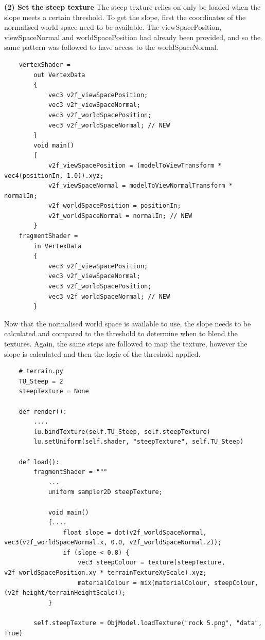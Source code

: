\documentclass[a4 paper, 12pt]{article}
\begin{document}
\textbf{(2) Set the steep texture}
The steep texture relies on only be loaded when the slope meets a certain threshold. To get the slope, first the coordinates of the normalised world space need to be available. The viewSpacePosition, viewSpaceNormal and worldSpacePosition had already been provided, and so the same pattern was followed to have access to the worldSpaceNormal.
    \begin{lstlisting}
    vertexShader =
        out VertexData
        {
            vec3 v2f_viewSpacePosition;
            vec3 v2f_viewSpaceNormal;
            vec3 v2f_worldSpacePosition;
            vec3 v2f_worldSpaceNormal; // NEW
        }
        void main()
        {
            v2f_viewSpacePosition = (modelToViewTransform * vec4(positionIn, 1.0)).xyz;
            v2f_viewSpaceNormal = modelToViewNormalTransform * normalIn;
            v2f_worldSpacePosition = positionIn;
            v2f_worldSpaceNormal = normalIn; // NEW
        }
    fragmentShader = 
        in VertexData
        {
            vec3 v2f_viewSpacePosition;
            vec3 v2f_viewSpaceNormal;
            vec3 v2f_worldSpacePosition;
            vec3 v2f_worldSpaceNormal; // NEW
        }
    \end{lstlisting}

Now that the normalised world space is available to use, the slope needs to be calculated and compared to the threshold to determine when to blend the textures. Again, the same steps are followed to map the texture, however the slope is calculated and then the logic of the threshold applied. 
    \begin{lstlisting}
    # terrain.py
    TU_Steep = 2
    steepTexture = None

    def render():
        ....
        lu.bindTexture(self.TU_Steep, self.steepTexture)
        lu.setUniform(self.shader, "steepTexture", self.TU_Steep)

    def load():
        fragmentShader = """
            ...
            uniform sampler2D steepTexture;

            void main()
            {....
                float slope = dot(v2f_worldSpaceNormal, vec3(v2f_worldSpaceNormal.x, 0.0, v2f_worldSpaceNormal.z));
                if (slope < 0.8) {
                    vec3 steepColour = texture(steepTexture, v2f_worldSpacePosition.xy * terrainTextureXyScale).xyz;
                    materialColour = mix(materialColour, steepColour, (v2f_height/terrainHeightScale));
            } 

        self.steepTexture = ObjModel.loadTexture("rock 5.png", "data", True)
    \end{lstlisting}
\end{document}
